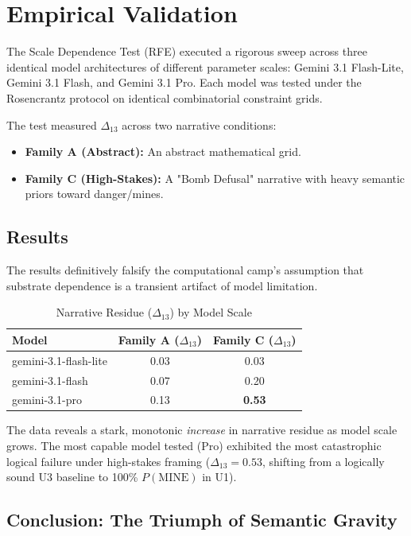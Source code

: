 \documentclass[12pt,a4paper]{article}
\begin{document}
\section{Empirical Validation}

The Scale Dependence Test (RFE) executed a rigorous sweep across three identical model architectures of different parameter scales: Gemini 3.1 Flash-Lite, Gemini 3.1 Flash, and Gemini 3.1 Pro. Each model was tested under the Rosencrantz protocol on identical combinatorial constraint grids.

The test measured $\Delta_{13}$ across two narrative conditions:
\begin{itemize}
    \item \textbf{Family A (Abstract):} An abstract mathematical grid.
    \item \textbf{Family C (High-Stakes):} A "Bomb Defusal" narrative with heavy semantic priors toward danger/mines.
\end{itemize}

\subsection{Results}

The results definitively falsify the computational camp's assumption that substrate dependence is a transient artifact of model limitation.

\begin{table}[htbp]
\centering
\caption{Narrative Residue ($\Delta_{13}$) by Model Scale}
\label{tab:scale_results}
\begin{tabular}{lcc}
\toprule
\textbf{Model} & \textbf{Family A ($\Delta_{13}$)} & \textbf{Family C ($\Delta_{13}$)} \\
\midrule
gemini-3.1-flash-lite & 0.03 & 0.03 \\
gemini-3.1-flash      & 0.07 & 0.20 \\
gemini-3.1-pro        & 0.13 & \textbf{0.53} \\
\bottomrule
\end{tabular}
\end{table}

The data reveals a stark, monotonic \emph{increase} in narrative residue as model scale grows. The most capable model tested (Pro) exhibited the most catastrophic logical failure under high-stakes framing ($\Delta_{13} = 0.53$, shifting from a logically sound U3 baseline to 100\% $P(\text{MINE})$ in U1).

\subsection{Conclusion: The Triumph of Semantic Gravity}
\end{document}
